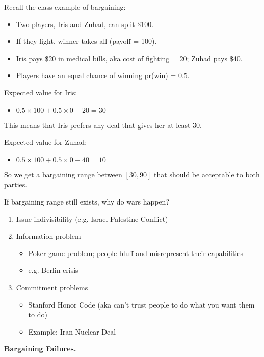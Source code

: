\documentclass{article}
\begin{document}
Recall the class example of bargaining:

\begin{itemize}
  \item Two players, Iris and Zuhad, can split \$100.
  \item If they fight, winner takes all (payoff = 100).
  \item Iris pays \$20 in medical bills, aka cost of fighting = 20; Zuhad pays \$40.
  \item Players have an equal chance of winning pr(win) = 0.5.
\end{itemize}

Expected value for Iris:
\begin{itemize}
  \item $0.5 \times 100 + 0.5 \times 0 - 20 = 30$
\end{itemize}

This means that Iris prefers any deal that gives her at least 30.

Expected value for Zuhad:
\begin{itemize}
  \item $0.5 \times 100 + 0.5 \times 0 - 40 = 10$
\end{itemize}

So we get a bargaining range between $[30, 90]$ that should be acceptable to both parties.

If bargaining range still exists, why do wars happen?

\begin{enumerate}
  \item Issue indivisibility (e.g. Israel-Palestine Conflict)
  \item Information problem
    \begin{itemize}
      \item Poker game problem; people bluff and misrepresent their capabilities
      \item e.g. Berlin crisis
    \end{itemize}
  \item Commitment problems
    \begin{itemize}
      \item Stanford Honor Code (aka can't trust people to do what you want them to do)
      \item Example: Iran Nuclear Deal
    \end{itemize}
\end{enumerate}

{\bf Bargaining Failures.}
\end{document}
